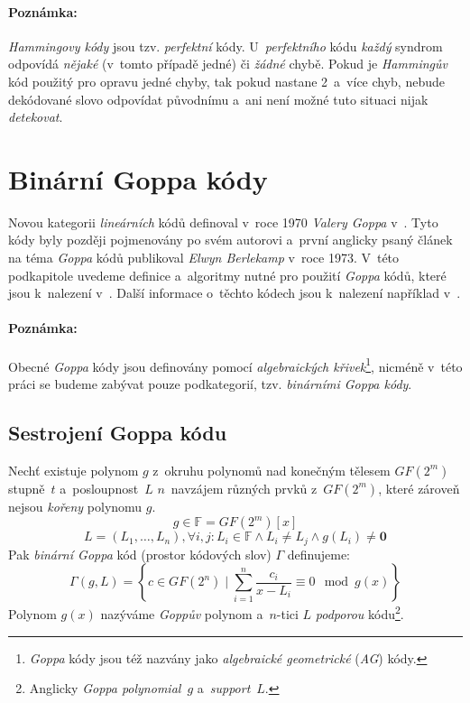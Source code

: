 \documentclass[thesis=M,czech,hidelinks]{FITthesis}[2012/06/26]
\newcommand{\0}{{\textcolor[gray]{0.75}{0}}}
\begin{document}
\paragraph{Poznámka:} \emph{Hammingovy kódy} jsou tzv. \emph{perfektní} kódy.
U~\emph{perfektního} kódu \emph{každý} syndrom odpovídá \emph{nějaké} (v~tomto
případě jedné) či \emph{žádné} chybě. Pokud je \emph{Hammingův} kód použitý pro
opravu jedné chyby, tak pokud nastane 2~a~více chyb, nebude dekódované slovo
odpovídat původnímu a~ani není možné tuto situaci nijak \emph{detekovat}.



\section{Binární Goppa kódy}\label{kap_goppa_kody}

Novou kategorii \emph{lineárních} kódů definoval v~roce 1970 \emph{Valery Goppa}
v~\cite{Goppa}. Tyto kódy byly později pojmenovány po svém autorovi a~první
anglicky psaný článek na téma \emph{Goppa} kódů publikoval \emph{Elwyn
Berlekamp} v~roce 1973. V~této podkapitole uvedeme definice a~algoritmy nutné
pro použití \emph{Goppa} kódů, které jsou k~nalezení
v~\cite{Berlekamp2,Engelbert}. Další informace o~těchto kódech jsou k~nalezení
například v~\cite{McEliece_coding}.

\paragraph{Poznámka:} Obecné \emph{Goppa} kódy jsou definovány pomocí
\emph{algebraických křivek}\footnote{
    \emph{Goppa} kódy jsou též nazvány jako \emph{algebraické geometrické}
    (\emph{AG}) kódy.
}, nicméně v~této práci se budeme zabývat pouze podkategorií, tzv.
\emph{binárními Goppa kódy}.


\subsection{Sestrojení Goppa kódu}

Nechť existuje polynom $g$ z~okruhu polynomů nad konečným tělesem $GF(2^m)$
stupně~$t$ a~posloupnost~$L$ $n$~navzájem různých prvků z~$GF(2^m)$, které
zároveň nejsou \emph{kořeny} polynomu $g$.
$$ g \in \mathbb{F} = GF(2^m)[x] $$
$$
    L = \left( L_1, \ldots, L_n \right),
        \forall i,j : L_i \in \mathbb{F} \land L_i \neq L_j \land g(L_i) \neq \mathbf{0}
$$
Pak \emph{binární Goppa} kód (prostor kódových slov) $\Gamma$ definujeme:
$$
    \Gamma(g,L) =
        \left\{
            c \in GF(2^n)
            \;|\;
            \sum_{i=1}^{n} \frac{c_i}{x - L_i} \equiv 0 \mod g(x)
        \right\}
$$
Polynom $g(x)$ nazýváme \emph{Goppův}
polynom a~$n$-tici $L$ \emph{podporou} kódu\footnote{
    Anglicky \emph{Goppa polynomial}~$g$ a~\emph{support}~$L$.
}.
\end{document}
